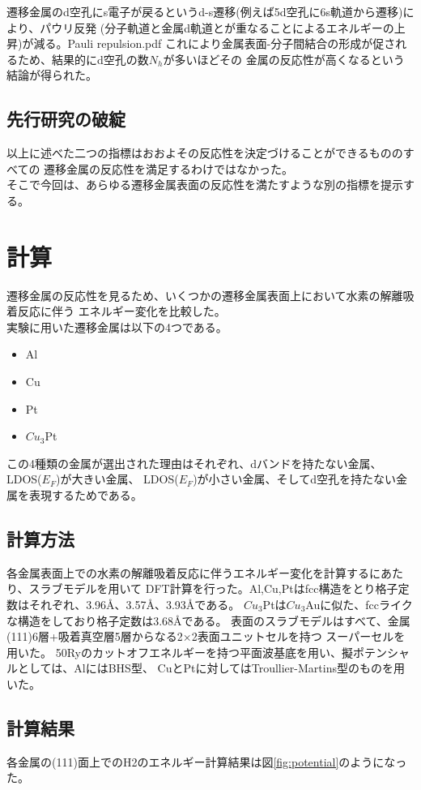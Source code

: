 \documentclass[12pt]{ltjsarticle}
\begin{document}
遷移金属のd空孔にs電子が戻るというd-s遷移(例えば5d空孔に6s軌道から遷移)により、パウリ反発
(分子軌道と金属d軌道とが重なることによるエネルギーの上昇)が減る。Pauli repulsion.pdf
これにより金属表面-分子間結合の形成が促されるため、結果的にd空孔の数$N_h$が多いほどその
金属の反応性が高くなるという結論が得られた。\cite{J.Harris1985}

\subsection{先行研究の破綻}
以上に述べた二つの指標はおおよその反応性を決定づけることができるもののすべての
遷移金属の反応性を満足するわけではなかった。\\
そこで今回は、あらゆる遷移金属表面の反応性を満たすような別の指標を提示する。

\section{計算}
遷移金属の反応性を見るため、いくつかの遷移金属表面上において水素の解離吸着反応に伴う
エネルギー変化を比較した。\\
実験に用いた遷移金属は以下の4つである。

\begin{itemize}
 \item Al
 \item Cu
 \item Pt
 \item $Cu_{3}$Pt
\end{itemize}

この4種類の金属が選出された理由はそれぞれ、dバンドを持たない金属、LDOS($E_F$)が大きい金属、
LDOS($E_F$)が小さい金属、そしてd空孔を持たない金属を表現するためである。

\subsection{計算方法}
各金属表面上での水素の解離吸着反応に伴うエネルギー変化を計算するにあたり、スラブモデルを用いて
DFT計算を行った。Al,Cu,Ptはfcc構造をとり格子定数はそれぞれ、3.96$\mbox{\AA}$、3.57$\mbox{\AA}$、3.93$\mbox{\AA}$である。
$Cu_3$Ptは$Cu_3$Auに似た、fccライクな構造をしており格子定数は3.68$\mbox{\AA}$である。
表面のスラブモデルはすべて、金属(111)6層+吸着真空層5層からなる2×2表面ユニットセルを持つ
スーパーセルを用いた。
50Ryのカットオフエネルギーを持つ平面波基底を用い、擬ポテンシャルとしては、AlにはBHS型、
CuとPtに対してはTroullier-Martins型のものを用いた。

\subsection{計算結果}
各金属の(111)面上でのH2のエネルギー計算結果は図\ref{fig:potential}のようになった。\\
\end{document}
